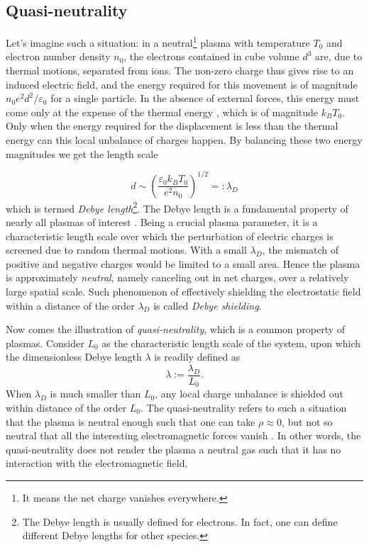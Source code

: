 \documentclass{report}
\begin{document}
\subsection{Quasi-neutrality} \label{sec:quasi-neutrality}
Let's imagine such a situation: in a neutral\footnote{It means the net charge vanishes everywhere.} plasma with temperature $T_0$ and electron number density $n_0$, the electrons contained in cube volume $d^3$ are, due to thermal motions, separated from ions. The non-zero charge thus gives rise to an induced electric field, and the energy required for this movement is of magnitude $n_0e^2d^2 / \varepsilon_0$ for a single particle. In the absence of external forces, this energy must come only at the expense of the thermal energy \citep{frank_1972}, which is of magnitude $k_BT_0$. Only when the energy required for the displacement is less than the thermal energy can this local unbalance of charges happen. By balancing these two energy magnitudes we get the length scale

\begin{equation*}
    d \sim \left(\frac{\varepsilon_0k_BT_0}{e^2n_0}\right)^{1/2} =: \lambda_D
\end{equation*}
which is termed \emph{Debye length}\footnote{The Debye length is usually defined for electrons. In fact, one can define different Debye lengths for other species.}. The Debye length is a fundamental property of nearly all plasmas of interest \citep{gibbon2020}. Being a crucial plasma parameter, it is a characteristic length scale over which the perturbation of electric charges is screened due to random thermal motions. With a small $\lambda_D$, the mismatch of positive and negative charges would be limited to a small area. Hence the plasma is approximately \emph{neutral}, namely canceling out in net charges, over a relatively large spatial scale. Such phenomenon of effectively shielding the electrostatic field within a distance of the order $\lambda_D$ is called \emph{Debye shielding}.

Now comes the illustration of \emph{quasi-neutrality}, which is a common property of plasmas. Consider $L_0$ as the characteristic length scale of the system, upon which the dimensionless Debye length $\lambda$ is readily defined as
\begin{equation*}
    \lambda := \frac{\lambda_D}{L_0}.
\end{equation*}
When $\lambda_D$ is much smaller than $L_0$, any local charge unbalance is shielded out within distance of the order $L_0$. The quasi-neutrality refers to such a situation that the plasma is neutral enough such that one can take $\rho \approx 0$, but not so neutral that all the interesting electromagnetic forces vanish \citep{chen2016}. In other words, the quasi-neutrality does not render the plasma a neutral gas such that it has no interaction with the electromagnetic field. 
\end{document}

